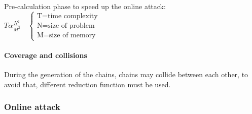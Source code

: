 Pre-calculation phase to speed up the online attack:
$T \alpha \frac{N^2}{M^2} \quad \begin{cases}
    \textrm{T=time complexity}\\
    \textrm{N=size of problem}\\
    \textrm{M=size of memory}
    \end{cases}$

\paragraph{Coverage and collisions}

During the generation of the chains, chains may collide between each other, to
avoid that, different reduction function must be used.

\subsubsection{Online attack}

